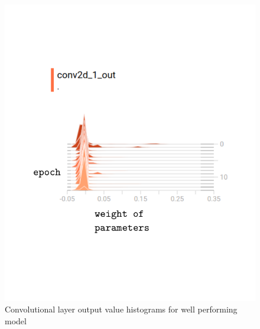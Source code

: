 \documentclass{article}
\begin{document}
{\begin{figure}[h]
  \includegraphics[scale=0.8]{goodearlyout.pdf}
  \caption{Convolutional layer output value histograms for well performing model}
  \label{fig:goodearlyout}
\end{figure}

}
\end{document}
